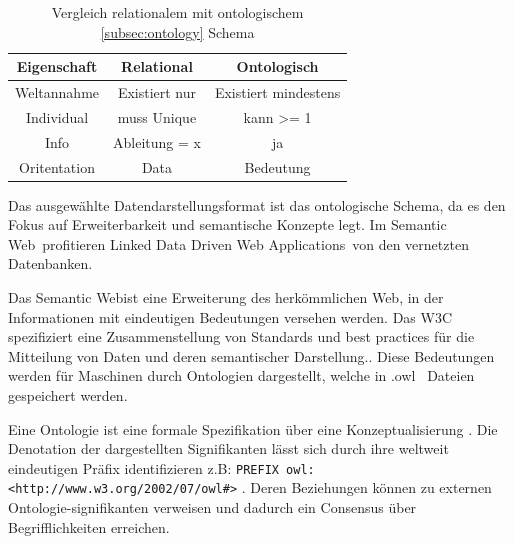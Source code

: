 \documentclass[
12pt,
english,
ngerman,
headsepline,
twoside,
openright,
numbers=noenddot,version=first
]{scrreprt}
\providecommand{\tabularnewline}{\\}
\begin{document}
\begin{table}[h]
	\caption{Vergleich relationalem mit ontologischem \autoref{subsec:ontology} Schema}
	\centering{}
	\begin{tabular}{ccc}
		\noalign{\vskip\doublerulesep}
		Eigenschaft & Relational & Ontologisch \tabularnewline[\doublerulesep]
		\hline\noalign{\vskip\doublerulesep}
		Weltannahme & Existiert nur & Existiert mindestens \tabularnewline[\doublerulesep]
		\noalign{\vskip\doublerulesep}
		Individual & muss Unique & kann >= 1 \tabularnewline[\doublerulesep]
		\noalign{\vskip\doublerulesep}
		Info & Ableitung = x & ja \tabularnewline[\doublerulesep]
		\noalign{\vskip\doublerulesep}
		Oritentation & Data & Bedeutung \tabularnewline[\doublerulesep]
		
	\end{tabular}
\end{table}

Das ausgewählte Datendarstellungsformat ist das ontologische Schema, da es den Fokus auf Erweiterbarkeit und semantische Konzepte legt.
Im \glqq Semantic Web\grqq\ profitieren \glqq Linked Data Driven Web Applications\grqq\ von den vernetzten Datenbanken.
\cite{W3C}


Das \glqq Semantic Web\grqq ist eine Erweiterung des herkömmlichen Web, in der Informationen mit eindeutigen Bedeutungen versehen werden\cite{ontoWhat2}. Das \acrfull{W3C} spezifiziert eine Zusammenstellung von Standards und best practices für die Mitteilung von Daten und deren semantischer Darstellung.\cite{sparqlLearn}.
Diese Bedeutungen werden für Maschinen durch Ontologien dargestellt, welche in \glqq .owl \grqq\ Dateien gespeichert werden.\cite{W3C}



Eine Ontologie\label{subsec:ontology} ist eine formale Spezifikation über eine Konzeptualisierung \cite{ontoWhat}. Die Denotation der dargestellten Signifikanten lässt sich durch ihre weltweit eindeutigen Präfix identifizieren z.B: \lstinline|PREFIX owl: <http://www.w3.org/2002/07/owl#>|  \cite{W3C}. Deren Beziehungen können zu externen Ontologie-signifikanten verweisen und dadurch ein Consensus über Begrifflichkeiten erreichen. 
\end{document}
